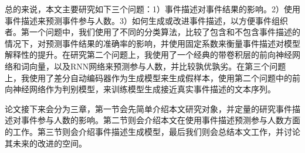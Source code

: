 \documentclass[]{template}
\begin{document}
总的来说，本文主要研究如下三个问题：1）事件描述对事件结果的影响。2）使用事件描述来预测事件参与人数。3）如何生成或改进事件描述，以方便事件组织者。第一个问题中，我们使用了不同的分类算法，比较了包含和不包含事件描述的情况下，对预测事件结果的准确率的影响，并使用固定系数来衡量事件描述对模型解释性的提升。在研究第二个问题上，我使用了一个经典的带卷积层的前向神经网络和词向量，以及RNN网络来预测参与人数，并比较孰优孰劣。在第三个问题上，我使用了差分自动编码器作为生成模型来生成假样本，使用第二个问题中的前向神经网络作为判别模型，来训练模型生成接近真实事件描述的文本序列。

论文接下来会分为三章，第一节会先简单介绍本文研究对象，并定量的研究事件描述对事件参与人数的影响。第二节则会介绍本文在使用事件描述预测参与人数方面的工作。第三节则会介绍事件描述生成模型，最后我们则会总结本文工作，并讨论其未来的改进的空间。
\end{document}
